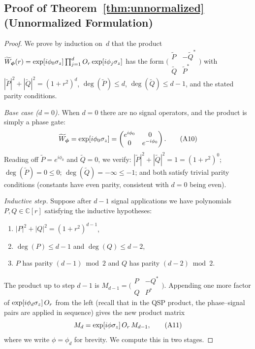\subsection*{Proof of Theorem~\ref{thm:unnormalized} (Unnormalized Formulation)}

\begin{proof}
	We prove by induction on~$d$ that the product
	$\widetilde{W}_{\bm{\phi}}(r) =
		\exp[i\phi_0\sigma_z]\prod_{j=1}^{d}O_r\exp[i\phi_j\sigma_z]$
	has the form
	$\bigl(\begin{smallmatrix} \tilde{P} & -\tilde{Q}^* \\
				\tilde{Q} & \tilde{P}^* \end{smallmatrix}\bigr)$ with
	$|\tilde{P}|^2 + |\tilde{Q}|^2 = (1+r^2)^d$,
	$\deg(\tilde{P}) \leq d$, $\deg(\tilde{Q}) \leq d-1$,
	and the stated parity conditions.

	\textit{Base case ($d = 0$).}
	When $d = 0$ there are no signal operators, and the
	product is simply a phase gate:
	\begin{equation}
		\widetilde{W}_{\bm{\phi}} = \exp[i\phi_0\sigma_z] =
		\begin{pmatrix} e^{i\phi_0} & 0            \\
                0           & e^{-i\phi_0}\end{pmatrix}.
		\tag{A10}
	\end{equation}
	Reading off $\tilde{P} = e^{i\phi_0}$ and
	$\tilde{Q} = 0$, we verify:
	$|\tilde{P}|^2 + |\tilde{Q}|^2 = 1 = (1+r^2)^0$;
	$\deg(\tilde{P}) = 0 \leq 0$;
	$\deg(\tilde{Q}) = -\infty \leq -1$;
	and both satisfy trivial parity conditions (constants
	have even parity, consistent with $d = 0$ being even).

	\textit{Inductive step.}
	Suppose after $d-1$ signal applications we have
	polynomials $P, Q \in \mathbb{C}[r]$ satisfying the
	inductive hypotheses:
	\begin{enumerate}
		\item $|P|^2 + |Q|^2 = (1+r^2)^{d-1}$,
		\item $\deg(P) \leq d-1$ and $\deg(Q) \leq d-2$,
		\item $P$ has parity $(d-1)\bmod 2$ and $Q$ has
		      parity $(d-2)\bmod 2$.
	\end{enumerate}
	The product up to step $d-1$ is
	$M_{d-1} = \bigl(\begin{smallmatrix} P & -Q^* \\
				Q & P^* \end{smallmatrix}\bigr)$.
	Appending one more factor of $\exp[i\phi_d\sigma_z]\,O_r$
	from the left (recall that in the QSP product, the
	phase--signal pairs are applied in sequence) gives the
	new product matrix
	\begin{equation}
		M_d = \exp[i\phi\sigma_z]\,O_r\,M_{d-1},
		\tag{A11}
	\end{equation}
	where we write $\phi = \phi_d$ for brevity.  We compute
	this in two stages.


\end{proof}

